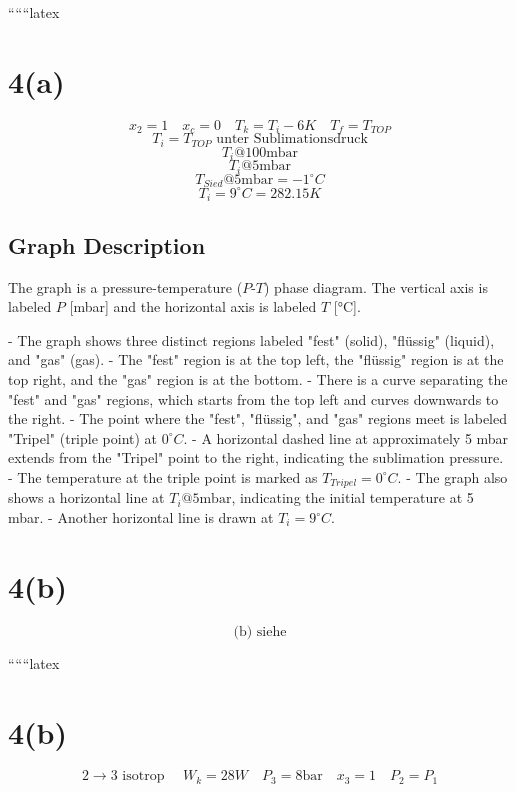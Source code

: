 
``````latex


\section*{4(a)}

\[ x_2 = 1 \quad x_c = 0 \quad T_k = T_i - 6K \quad T_f = T_{TOP} \]
\[ T_i = T_{TOP} \text{ unter Sublimationsdruck} \]
\[ T_i @ 100 \text{mbar} \]
\[ T_i @ 5 \text{mbar} \]
\[ T_{Sied} @ 5 \text{mbar} = -1^\circ C \]
\[ T_i = 9^\circ C = 282.15K \]

\subsection*{Graph Description}

The graph is a pressure-temperature ($P$-$T$) phase diagram. The vertical axis is labeled $P$ [mbar] and the horizontal axis is labeled $T$ [°C]. 

- The graph shows three distinct regions labeled "fest" (solid), "flüssig" (liquid), and "gas" (gas).
- The "fest" region is at the top left, the "flüssig" region is at the top right, and the "gas" region is at the bottom.
- There is a curve separating the "fest" and "gas" regions, which starts from the top left and curves downwards to the right.
- The point where the "fest", "flüssig", and "gas" regions meet is labeled "Tripel" (triple point) at $0^\circ C$.
- A horizontal dashed line at approximately 5 mbar extends from the "Tripel" point to the right, indicating the sublimation pressure.
- The temperature at the triple point is marked as $T_{Tripel} = 0^\circ C$.
- The graph also shows a horizontal line at $T_i @ 5 \text{mbar}$, indicating the initial temperature at 5 mbar.
- Another horizontal line is drawn at $T_i = 9^\circ C$.

\section*{4(b)}

\[
\text{(b) siehe}
\]

``````latex


\section*{4(b)}


\[
2 \rightarrow 3 \text{ isotrop } \quad W_k = 28W \quad P_3 = 8 \text{bar} \quad x_3 = 1 \quad P_2 = P_1
\]

